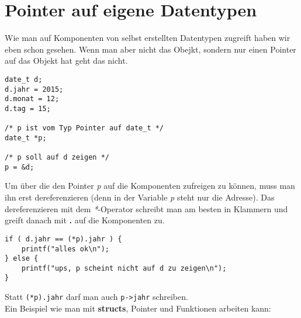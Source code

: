 \documentclass[c_worksheet.tex]{subfiles}
\begin{document}
\section{Pointer auf eigene Datentypen}

Wie man auf Komponenten von selbst erstellten Datentypen zugreift haben wir eben schon gesehen. Wenn man aber nicht das Obejkt, sondern nur einen Pointer auf das Objekt hat geht das nicht.

\begin{lstlisting}[numbers=none]
date_t d;
d.jahr = 2015;
d.monat = 12;
d.tag = 15;

/* p ist vom Typ Pointer auf date_t */
date_t *p;

/* p soll auf d zeigen */
p = &d;
\end{lstlisting}

Um über die den Pointer \textit{p} auf die Komponenten zufreigen zu können, muss man ihn erst dereferenzieren (denn in der Variable \textit{p} steht nur die Adresse). Das dereferenzieren mit dem \textit{*}-Operator schreibt man am besten in Klammern und greift danach mit \textbf{.} auf die Komponenten zu.

\begin{lstlisting}[numbers=none]
if ( d.jahr == (*p).jahr ) {
    printf("alles ok\n");
} else {
    printf("ups, p scheint nicht auf d zu zeigen\n");
}
\end{lstlisting}

Statt \lstinline$(*p).jahr$ darf man auch \lstinline$p->jahr$ schreiben.\\

Ein Beispiel wie man mit \textbf{structs}, Pointer und Funktionen arbeiten kann:
\end{document}
